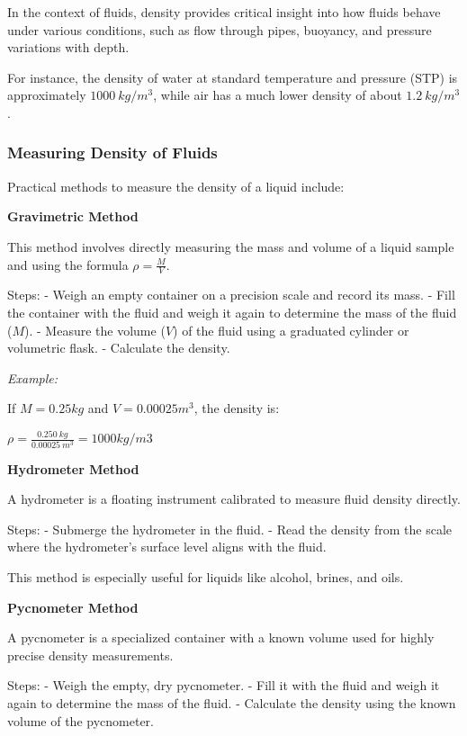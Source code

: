 \documentclass[11pt]{article}
\begin{document}
In the context of fluids, density provides critical insight into how
fluids behave under various conditions, such as flow through pipes,
buoyancy, and pressure variations with depth.

For instance, the density of water at standard temperature and pressure
(STP) is approximately \(1000~kg/m^3\), while air has a much lower
density of about \(1.2~kg/m^3\).

\hypertarget{measuring-density-of-fluids}{%
\subsubsection{Measuring Density of
Fluids}\label{measuring-density-of-fluids}}

Practical methods to measure the density of a liquid include:

\textbf{Gravimetric Method}

This method involves directly measuring the mass and volume of a liquid
sample and using the formula \(\rho = \frac{M}{V}\).

Steps: - Weigh an empty container on a precision scale and record its
mass. - Fill the container with the fluid and weigh it again to
determine the mass of the fluid (\(M\)). - Measure the volume (\(V\)) of
the fluid using a graduated cylinder or volumetric flask. - Calculate
the density.

\emph{Example:}

If \(M=0.25 kg\) and \(V=0.00025 m^3\), the density is:

\(\rho=\frac{0.250~kg}{0.00025~m^3}=1000 kg/m3\)

\textbf{Hydrometer Method}

A hydrometer is a floating instrument calibrated to measure fluid
density directly.

Steps: - Submerge the hydrometer in the fluid. - Read the density from
the scale where the hydrometer's surface level aligns with the fluid.

This method is especially useful for liquids like alcohol, brines, and
oils.

\textbf{Pycnometer Method}

A pycnometer is a specialized container with a known volume used for
highly precise density measurements.

Steps: - Weigh the empty, dry pycnometer. - Fill it with the fluid and
weigh it again to determine the mass of the fluid. - Calculate the
density using the known volume of the pycnometer.
\end{document}

